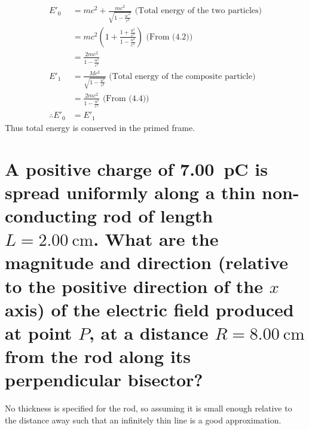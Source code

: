 \documentclass[a4paper]{scrartcl}
\begin{document}
\begin{align*}
    E'_0 &= m c^2 + \frac{m c^2}{\sqrt{1 - \frac{u'^2}{c^2}}} \text{ (Total energy of the two particles)} \\
    &= m c^2 \left(1 + \frac{1 + \frac{u^2}{c^2}}{1 - \frac{u^2}{c^2}}\right) \text{ (From (4.2))} \\
    &= \frac{2 m c^2}{1 - \frac{u^2}{c^2}} \\
    E'_1 &= \frac{M c^2}{\sqrt{1 - \frac{u^2}{c^2}}} \text{ (Total energy of the composite particle)} \\
    &= \frac{2 m c^2}{1 - \frac{u^2}{c^2}} \text{ (From (4.4))} \\
    \therefore E'_0 &= E'_1
\end{align*}
Thus total energy is conserved in the primed frame.

\section{A positive charge of \SI{7.00}{\pico\coulomb} is spread uniformly along a thin non-conducting rod of length \(L = \SI{2.00}{\centi\metre}\). What are the magnitude and direction (relative to the positive direction of the \(x\) axis) of the electric field produced at point \(P\), at a distance \(R = \SI{8.00}{\centi\metre}\) from the rod along its perpendicular bisector?}
No thickness is specified for the rod, so assuming it is small enough relative to the distance away such that an infinitely thin line is a good approximation.
\end{document}

